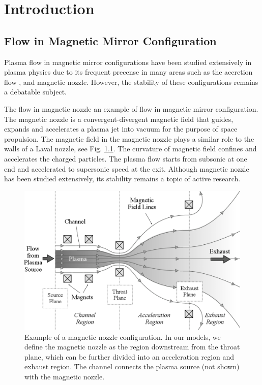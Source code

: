 \chapter{Introduction}

\section{Flow in Magnetic Mirror Configuration}
Plasma flow in magnetic mirror configurations have been studied extensively in plasma physics due to its frequent precense in many areas such as the accretion flow \cite{jockers_stability_1968,aikawa_stability_1979}, and magnetic nozzle\cite{smolyakov_quasineutral_2021}. However, the stability of these configurations remains a debatable subject.

The flow in magnetic nozzle an example of flow in magnetic mirror configuration. The magnetic nozzle is a convergent-divergent magnetic field that guides, expands and accelerates a plasma jet into vacuum for the purpose of space propulsion. \cite{andersen_continuous_1969,boswell_experimental_2004,williams_fusion_2003} The magnetic field in the magnetic nozzle plays a similar role to the walls of a Laval nozzle, see Fig. \ref{fig:magnetic-nozzle}. The curvature of magnetic field confines and accelerates the charged particles. The plasma flow starts from subsonic at one end and accelerated to supersonic speed at the exit. Although magnetic nozzle has been studied extensively, its stability remains a topic of active research.

\begin{figure}[h]
	\centering
	\includegraphics[width=0.7\linewidth]{img/introduction/magnetic_nozzle}
	\caption{Example of a magnetic nozzle configuration. In our models, we define the magnetic nozzle as the region downstream from the throat plane, which can be further divided into an acceleration region and exhaust region. The channel connects the plasma source (not shown) with the magnetic nozzle. \cite{little_performance_2015}}
	\label{fig:magnetic-nozzle}
\end{figure}


